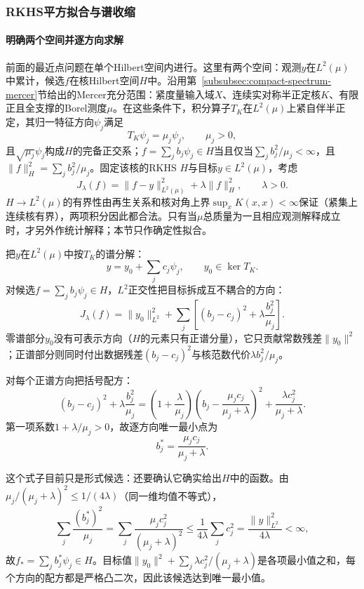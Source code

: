 \subsubsection{RKHS平方拟合与谱收缩}
\label{subsubsec:rkhs-spectral-shrinkage}

\paragraph{明确两个空间并逐方向求解}

前面的最近点问题在单个Hilbert空间内进行。这里有两个空间：观测$y$在$L^2(\mu)$中累计，候选$f$在核Hilbert空间$H$中。沿用第~\ref{subsubsec:compact-spectrum-mercer}节给出的Mercer充分范围：紧度量输入域$X$、连续实对称半正定核$K$、有限正且全支撑的Borel测度$\mu$。在这些条件下，积分算子$T_K$在$L^2(\mu)$上紧自伴半正定，其归一特征方向$\psi_j$满足
\[
  T_K\psi_j=\mu_j\psi_j,\qquad \mu_j>0,
\]
且$\sqrt{\mu_j}\psi_j$构成$H$的完备正交系；$f=\sum_jb_j\psi_j\in H$当且仅当$\sum_jb_j^2/\mu_j<\infty$，且$\|f\|_H^2=\sum_jb_j^2/\mu_j$。固定该核的RKHS $H$与目标$y\in L^2(\mu)$，考虑
\begin{equation}
  J_\lambda(f)=\|f-y\|_{L^2(\mu)}^2+\lambda\|f\|_H^2,
  \qquad\lambda>0.
  \label{eq:functional-tikhonov-spectral-objective}
\end{equation}
$H\to L^2(\mu)$的有界性由再生关系和核对角上界$\sup_xK(x,x)<\infty$保证（紧集上连续核有界），两项积分因此都合法。只有当$\mu$总质量为一且相应观测解释成立时，才另外作统计解释；本节只作确定性拟合。

把$y$在$L^2(\mu)$中按$T_K$的谱分解：
\[
  y=y_0+\sum_jc_j\psi_j,\qquad y_0\in\ker T_K.
\]
对候选$f=\sum_jb_j\psi_j\in H$，$L^2$正交性把目标拆成互不耦合的方向：
\[
  J_\lambda(f)
  =\|y_0\|_{L^2}^2+\sum_j\left[(b_j-c_j)^2+\lambda\frac{b_j^2}{\mu_j}\right].
\]
零谱部分$y_0$没有可表示方向（$H$的元素只有正谱分量），它只贡献常数残差$\|y_0\|^2$；正谱部分则同时付出数据残差$(b_j-c_j)^2$与核范数代价$\lambda b_j^2/\mu_j$。

对每个正谱方向把括号配方：
\[
  (b_j-c_j)^2+\lambda\frac{b_j^2}{\mu_j}
  =\left(1+\frac{\lambda}{\mu_j}\right)
  \left(b_j-\frac{\mu_jc_j}{\mu_j+\lambda}\right)^2
  +\frac{\lambda c_j^2}{\mu_j+\lambda}.
\]
第一项系数$1+\lambda/\mu_j>0$，故逐方向唯一最小点为
\begin{equation}
  b_j^*=\frac{\mu_jc_j}{\mu_j+\lambda}.
  \label{eq:functional-spectral-shrinkage}
\end{equation}

这个式子目前只是形式候选：还要确认它确实给出$H$中的函数。由$\mu_j/(\mu_j+\lambda)^2\le1/(4\lambda)$（同一维均值不等式），
\[
  \sum_j\frac{(b_j^*)^2}{\mu_j}
  =\sum_j\frac{\mu_jc_j^2}{(\mu_j+\lambda)^2}
  \le\frac{1}{4\lambda}\sum_jc_j^2
  =\frac{\|y\|_{L^2}^2}{4\lambda}<\infty,
\]
故$f_*=\sum_jb_j^*\psi_j\in H$。目标值$\|y_0\|^2+\sum_j\lambda c_j^2/(\mu_j+\lambda)$是各项最小值之和，每个方向的配方都是严格凸二次，因此该候选达到唯一最小值。

